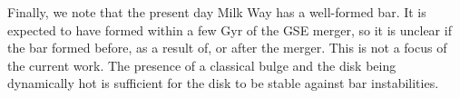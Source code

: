 \documentclass[linenumbers, twocolumn]{aastex631}
\begin{document}
Finally, we note that the present day Milk Way has a well-formed bar. It is
expected to have formed within a few Gyr of the GSE merger, so it is unclear if
the bar formed before, as a result of, or after the merger. This is not a focus
of the current work. The presence of a classical bulge and the disk being
dynamically hot is sufficient for the disk to be stable against bar
instabilities.
\end{document}
